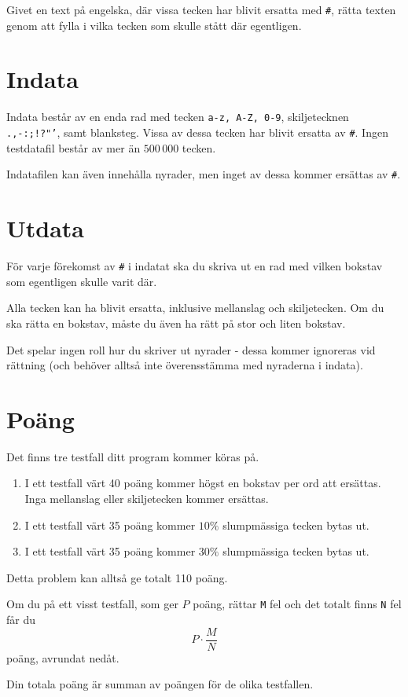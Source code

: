 
Givet en text på engelska, där vissa tecken har blivit ersatta med \texttt{\#}, rätta texten genom att fylla i vilka tecken som skulle stått där egentligen.

\section*{Indata}
Indata består av en enda rad med tecken \texttt{a-z, A-Z, 0-9}, skiljetecknen \texttt{.,-:;!?"'}, samt blanksteg. Vissa av dessa tecken har blivit ersatta av \texttt{\#}.
Ingen testdatafil består av mer än $500\,000$ tecken.

Indatafilen kan även innehålla nyrader, men inget av dessa kommer ersättas av \texttt{\#}.

\section*{Utdata}
För varje förekomst av \texttt{\#} i indatat ska du skriva ut en rad med vilken bokstav som egentligen skulle varit där.

Alla tecken kan ha blivit ersatta, inklusive mellanslag och skiljetecken. Om du ska rätta en bokstav, måste du även ha rätt på stor och liten bokstav.

Det spelar ingen roll hur du skriver ut nyrader - dessa kommer ignoreras vid rättning (och behöver alltså inte överensstämma med nyraderna i indata).

\section*{Poäng}

Det finns tre testfall ditt program kommer köras på.
\begin{enumerate}
  \item I ett testfall värt 40 poäng kommer högst en bokstav per ord att ersättas. Inga mellanslag eller skiljetecken kommer ersättas.
  \item I ett testfall värt 35 poäng kommer $10\%$ slumpmässiga tecken bytas ut.
  \item I ett testfall värt 35 poäng kommer $30\%$ slumpmässiga tecken bytas ut.
\end{enumerate}

Detta problem kan alltså ge totalt 110 poäng.

Om du på ett visst testfall, som ger $P$ poäng, rättar \texttt{M} fel och det totalt finns \texttt{N} fel får du 
$$P \cdot \frac{M}{N}$$
poäng, avrundat nedåt.

Din totala poäng är summan av poängen för de olika testfallen.
